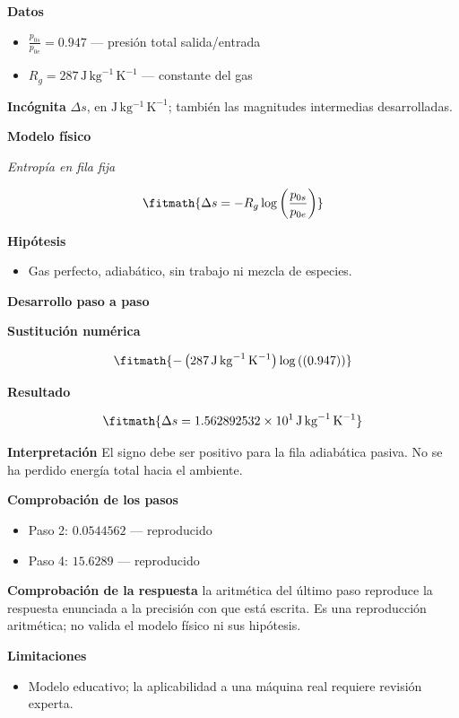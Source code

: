 \documentclass[10pt,openany]{book}
\begin{document}
\noindent\textbf{Datos}
\begin{itemize}
\item $\frac{p_{0s}}{p_{0e}} = 0.947$ — presión total salida/entrada
\item $R_g = 287\,\mathrm{J}\,\mathrm{kg}^{-1}\,\mathrm{K}^{-1}$ — constante del gas
\end{itemize}

\noindent\textbf{Incógnita}
$\Delta s$, en $\mathrm{J\,kg^{-1}\,K^{-1}}$; también las magnitudes intermedias desarrolladas.

\noindent\textbf{Modelo físico}

\noindent\textit{Entropía en fila fija}

\[
\fitmath{\Delta s=- R_g \log{\left(\frac{p_{0s}}{p_{0e}} \right)}}
\]

\noindent\textbf{Hipótesis}
\begin{itemize}
\item Gas perfecto, adiabático, sin trabajo ni mezcla de especies.
\end{itemize}

\noindent\textbf{Desarrollo paso a paso}



\noindent\textbf{Sustitución numérica}

\[
\fitmath{- \left(287\,\mathrm{J}\,\mathrm{kg}^{-1}\,\mathrm{K}^{-1}\right) \log{\left(\left(0.947\right) \right)}}
\]

\noindent\textbf{Resultado}

\[
\fitmath{\Delta s=1.562892532\times10^{1}\,\mathrm{J}\,\mathrm{kg}^{-1}\,\mathrm{K}^{-1}}
\]

\noindent\textbf{Interpretación}
El signo debe ser positivo para la fila adiabática pasiva. No se ha perdido energía total hacia el ambiente.

\noindent\textbf{Comprobación de los pasos}
\begin{itemize}
\item Paso 2: $0.0544562$ — reproducido
\item Paso 4: $15.6289$ — reproducido
\end{itemize}

\noindent\textbf{Comprobación de la respuesta} la aritmética del último paso reproduce la respuesta enunciada a la precisión con que está escrita. Es una reproducción aritmética; no valida el modelo físico ni sus hipótesis.

\noindent\textbf{Limitaciones}
\begin{itemize}
\item Modelo educativo; la aplicabilidad a una máquina real requiere revisión experta.
\end{itemize}
\end{document}
